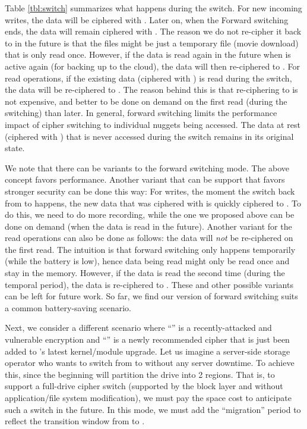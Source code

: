 Table \cref{tbl:switch} summarizes what happens during the switch. For new
incoming writes, the data will be ciphered with \ctwo. Later on, when the
Forward switching ends, the data will remain ciphered with \ctwo. The reason we
do not re-cipher it back to \cone in the future is that the files might be just
a temporary file (\eg movie download) that is only read once. However, if the
data is read again in the future when \cone is active again (\eg for backing up
to the cloud), the data will then re-ciphered to \cone. For read operations, if
the existing data (ciphered with \cone) is read during the switch, the data will
be re-ciphered to \ctwo. The reason behind this is that re-ciphering to \ctwo is
not expensive, and better to be done on demand on the first read (during the
switching) than later. In general, forward switching limits the performance
impact of cipher switching to individual nuggets being accessed. The data at
rest (ciphered with \cone) that is never accessed during the switch remains in
its original state.

We note that there can be variants to the forward switching mode. The above
concept favors performance. Another variant that can be support that favors
stronger security can be done this way: For writes, the moment the switch back
from \ctwo to \cone happens, the new data that was ciphered with \ctwo is
quickly ciphered to \cone. To do this, we need to do more recording, while the
one we proposed above can be done on demand (when the data is read in the
future). Another variant for the read operations can also be done as follows:
the data will {\em not} be re-ciphered on the first read. The intuition is that
forward switching only happens temporarily (while the battery is low), hence
data being read might only be read once and stay in the memory. However, if the
data is read the second time (during the temporal period), the data is
re-ciphered to \ctwo. These and other possible variants can be left for future
work. So far, we find our version of forward switching suits a common
battery-saving scenario.



 Next, we consider a different scenario where
``\cone'' is a recently-attacked and vulnerable encryption and ``\ctwo'' is a
newly recommended cipher that is just been added to \sys's latest kernel/module
upgrade. Let us imagine a server-side storage operator who wants to switch from
\cone to \ctwo without any server downtime. To achieve this, \sys since the
beginning will partition the drive into 2 regions. That is, to support a
full-drive cipher switch (supported by the block layer and without
application/file system modification), we must pay the space cost to anticipate
such a switch in the future. In this mode, we must add the ``migration'' period
to reflect the transition window from \cone to \ctwo.

